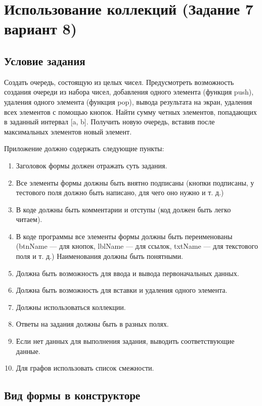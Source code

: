\section{Использование коллекций (Задание 7 вариант 8)}

\subsection{Условие задания}

Создать очередь, состоящую из целых чисел. Предусмотреть возможность создания очереди из набора чисел, добавления одного элемента (функция push), удаления одного элемента (функция pop), вывода результата на экран, удаления всех элементов с помощью кнопок. Найти сумму четных элементов, попадающих в заданный интервал [a, b]. Получить новую очередь, вставив после максимальных элементов новый элемент.

Приложение должно содержать следующие пункты:

\begin{enumerate}
    \item{Заголовок формы должен отражать суть задания.}
    \item{Все элементы формы должны быть внятно подписаны (кнопки подписаны, у тестового поля должно быть написано, для чего оно нужно и т. д.)}
    \item{В коде должны быть комментарии и отступы (код должен быть легко читаем).}
    \item{В коде программы все элементы формы должны быть переименованы (btnName ---  для кнопок, lblName --- для ссылок, txtName --- для текстового поля и т. д.) Наименования должны быть понятными.}
    \item{Должна быть возможность для ввода и вывода первоначальных данных.}
    \item{Должна быть возможность для вставки и удаления одного элемента.}
    \item{Должны использоваться коллекции.}
    \item{Ответы на задания должны быть в разных полях.}
    \item{Если нет данных для выполнения задания, выводить соответствующие данные.}
    \item{Для графов использовать список смежности.}
\end{enumerate}

\subsection{Вид формы в конструкторе}

